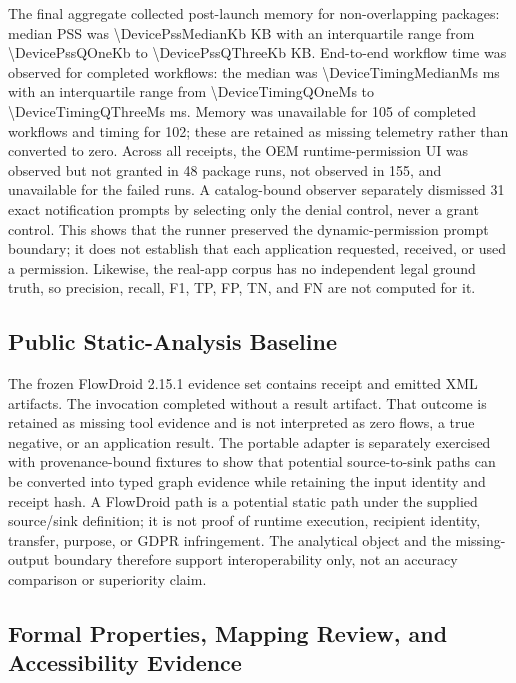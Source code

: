 The final aggregate collected post-launch memory for \PssObservedN{} non-overlapping packages: median PSS was \num{\DevicePssMedianKb} KB with an interquartile range from \num{\DevicePssQOneKb} to \num{\DevicePssQThreeKb} KB. End-to-end workflow time was observed for \TimingObservedN{} completed workflows: the median was \num{\DeviceTimingMedianMs} ms with an interquartile range from \num{\DeviceTimingQOneMs} to \num{\DeviceTimingQThreeMs} ms. Memory was unavailable for 105 of \CompletedWorkflowsN{} completed workflows and timing for 102; these are retained as missing telemetry rather than converted to zero. Across all receipts, the OEM runtime-permission UI was observed but not granted in 48 package runs, not observed in 155, and unavailable for the \FailedDeviceWorkflowsN{} failed runs. A catalog-bound observer separately dismissed 31 exact notification prompts by selecting only the denial control, never a grant control. This shows that the runner preserved the dynamic-permission prompt boundary; it does not establish that each application requested, received, or used a permission. Likewise, the real-app corpus has no independent legal ground truth, so precision, recall, F1, TP, FP, TN, and FN are not computed for it.

\subsection{Public Static-Analysis Baseline}

The frozen FlowDroid 2.15.1 evidence set contains \FlowDroidReceiptsN{} receipt and \FlowDroidXmlArtifactsN{} emitted XML artifacts. The invocation completed without a result artifact. That outcome is retained as missing tool evidence and is not interpreted as zero flows, a true negative, or an application result. The portable adapter is separately exercised with provenance-bound fixtures to show that potential source-to-sink paths can be converted into typed graph evidence while retaining the input identity and receipt hash. A FlowDroid path is a potential static path under the supplied source/sink definition; it is not proof of runtime execution, recipient identity, transfer, purpose, or GDPR infringement. The analytical object and the missing-output boundary therefore support interoperability only, not an accuracy comparison or superiority claim.

\subsection{Formal Properties, Mapping Review, and Accessibility Evidence}

